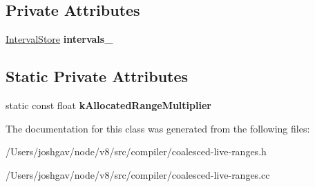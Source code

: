 \subsection*{Private Attributes}
\begin{DoxyCompactItemize}
\item 
\hyperlink{classv8_1_1internal_1_1_zone_set}{Interval\+Store} {\bfseries intervals\+\_\+}\hypertarget{classv8_1_1internal_1_1compiler_1_1_coalesced_live_ranges_a397235300dd11d082d9f8b0efb95a77c}{}\label{classv8_1_1internal_1_1compiler_1_1_coalesced_live_ranges_a397235300dd11d082d9f8b0efb95a77c}

\end{DoxyCompactItemize}
\subsection*{Static Private Attributes}
\begin{DoxyCompactItemize}
\item 
static const float {\bfseries k\+Allocated\+Range\+Multiplier}\hypertarget{classv8_1_1internal_1_1compiler_1_1_coalesced_live_ranges_a397687a8923a4c011618cdd99d9c2bdf}{}\label{classv8_1_1internal_1_1compiler_1_1_coalesced_live_ranges_a397687a8923a4c011618cdd99d9c2bdf}

\end{DoxyCompactItemize}


The documentation for this class was generated from the following files\+:\begin{DoxyCompactItemize}
\item 
/\+Users/joshgav/node/v8/src/compiler/coalesced-\/live-\/ranges.\+h\item 
/\+Users/joshgav/node/v8/src/compiler/coalesced-\/live-\/ranges.\+cc\end{DoxyCompactItemize}
